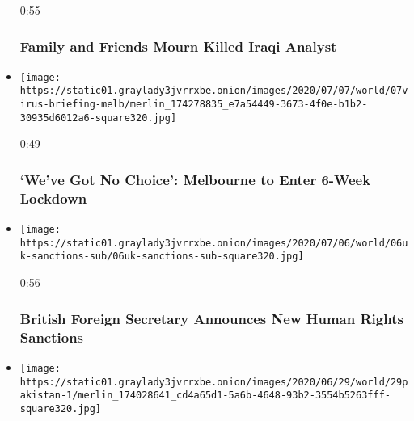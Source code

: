 \begin{itemize}
  0:55

  \hypertarget{family-and-friends-mourn-killed-iraqi-analyst}{%
  \subsubsection{Family and Friends Mourn Killed Iraqi
  Analyst}\label{family-and-friends-mourn-killed-iraqi-analyst}}
\item
  \href{https://www.nytimes3xbfgragh.onion/video/world/australia/100000007227099/melbourne-australia-lockdown.html?action=click\&module=video-series-bar\&region=header\&pgtype=Article\&playlistId=video/world}{}

  \texttt{[image: https://static01.graylady3jvrrxbe.onion/images/2020/07/07/world/07virus-briefing-melb/merlin\_174278835\_e7a54449-3673-4f0e-b1b2-30935d6012a6-square320.jpg]}

  0:49

  \hypertarget{weve-got-no-choice-melbourne-to-enter-6-week-lockdown}{%
  \subsubsection{`We've Got No Choice': Melbourne to Enter 6-Week
  Lockdown}\label{weve-got-no-choice-melbourne-to-enter-6-week-lockdown}}
\item
  \href{https://www.nytimes3xbfgragh.onion/video/us/100000007226270/britain-raab-human-rights-sanctions.html?action=click\&module=video-series-bar\&region=header\&pgtype=Article\&playlistId=video/world}{}

  \texttt{[image: https://static01.graylady3jvrrxbe.onion/images/2020/07/06/world/06uk-sanctions-sub/06uk-sanctions-sub-square320.jpg]}

  0:56

  \hypertarget{british-foreign-secretary-announces-new-human-rights-sanctions}{%
  \subsubsection{British Foreign Secretary Announces New Human Rights
  Sanctions}\label{british-foreign-secretary-announces-new-human-rights-sanctions}}
\item
  \href{https://www.nytimes3xbfgragh.onion/video/world/middleeast/100000007214556/pakistan-stock-exchange.html?action=click\&module=video-series-bar\&region=header\&pgtype=Article\&playlistId=video/world}{}

  \texttt{[image: https://static01.graylady3jvrrxbe.onion/images/2020/06/29/world/29pakistan-1/merlin\_174028641\_cd4a65d1-5a6b-4648-93b2-3554b5263fff-square320.jpg]}


\end{itemize}
